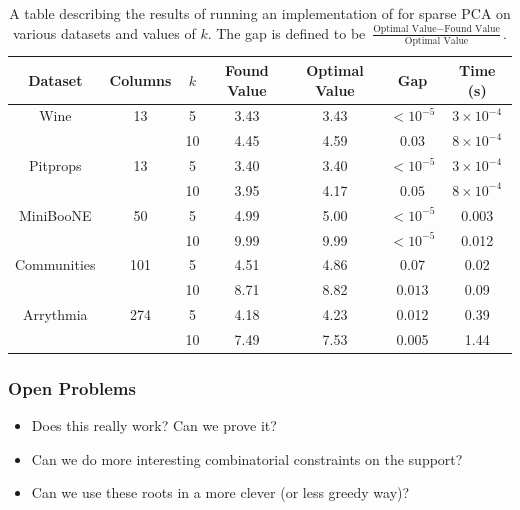 \documentclass{beamer}
\begin{document}
\begin{frame}
    \tiny{
\begin{table}[H]
\begin{center}
    \begin{tabular}{c|c c c c c c}
        Dataset & Columns & $k$ & Found Value & Optimal Value & Gap & Time (s)\\
        \hline
        Wine & 13 & 5 & 3.43 & 3.43 & $<10^{-5}$ & $3\times 10^{-4}$\\
             &    & 10 & 4.45 & 4.59 & $0.03$ & $8\times 10^{-4}$\\
        \hline
        Pitprops & 13 & 5 & 3.40 & 3.40 & $<10^{-5}$ & $3\times 10^{-4}$\\
             &    & 10 & 3.95 & 4.17 & $0.05$ & $8\times 10^{-4}$\\
        \hline
        MiniBooNE & 50 & 5 & 4.99 & 5.00 & $<10^{-5}$ & 0.003\\
             &    & 10 & 9.99 & 9.99 & $<10^{-5}$ & 0.012\\
        \hline
        Communities & 101 & 5 & 4.51 & 4.86 & 0.07 & 0.02 \\
             &    & 10 & 8.71 & 8.82 & $0.013$ & 0.09\\
        \hline
        Arrythmia & 274 & 5 & 4.18 & 4.23 & 0.012 & 0.39\\
         & & 10 & 7.49 & 7.53 & 0.005 & 1.44
    \end{tabular}

\end{center}
\caption{A table describing the results of running an implementation of  for sparse PCA on various datasets and values of $k$.  The gap is defined to be $\frac{\text{Optimal Value} - \text{Found Value}}{\text{Optimal Value}}$.}
\end{table}}
\end{frame}
\begin{frame}
    \frametitle{Open Problems}
    \begin{itemize}
        \item Does this really work? Can we prove it?
        \item Can we do more interesting combinatorial constraints on the support?
        \item Can we use these roots in a more clever (or less greedy way)?
    \end{itemize}
\end{frame}
\end{document}
